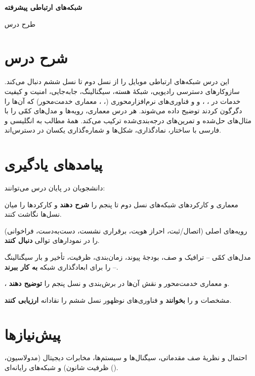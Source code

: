 \documentclass[11pt,a4paper]{article}
\begin{document}
\begin{center}
  {\ACNheadfont\bfseries\color{acnnavy}\LARGE شبکه‌های ارتباطی پیشرفته\par}
  \vspace{2pt}
  {\ACNheadfont\color{acnteal}\Large طرح درس\par}
  \vspace{2pt}
  {\par}
\end{center}

\section{شرح درس}
این درس شبکه‌های ارتباطی موبایل را از نسل دوم تا نسل ششم دنبال می‌کند. سازوکارهای دسترسی رادیویی، شبکهٔ هسته، سیگنالینگ، جابه‌جایی، امنیت و کیفیت
خدمات در ، ،  و  و فناوری‌های نرم‌افزارمحوری (، ، معماری خدمت‌محور) که آن‌ها را دگرگون
کردند توضیح داده می‌شوند. هر درس معماری، رویه‌ها و مدل‌های کمّی را با مثال‌های حل‌شده و تمرین‌های درجه‌بندی‌شده ترکیب می‌کند. همهٔ مطالب به انگلیسی و
فارسی با ساختار، نمادگذاری، شکل‌ها و شماره‌گذاری یکسان در دسترس‌اند.

\section{پیامدهای یادگیری}
دانشجویان در پایان درس می‌توانند:
\begin{objectives}
  \item معماری و کارکردهای شبکه‌های نسل دوم تا پنجم را \textbf{شرح دهند} و کارکردها را میان نسل‌ها نگاشت کنند.
  \item رویه‌های اصلی (اتصال/ثبت، احراز هویت، برقراری نشست، دست‌به‌دست، فراخوانی) را در نمودارهای توالی \textbf{دنبال کنند}.
  \item مدل‌های کمّی -- ترافیک و صف، بودجهٔ پیوند، زمان‌بندی، ظرفیت، تأخیر و بار سیگنالینگ -- را برای ابعادگذاری شبکه \textbf{به کار ببرند}.
  \item {}،  و معماری خدمت‌محور و نقش آن‌ها در برش‌بندی و  نسل پنجم را \textbf{توضیح دهند}.
  \item مشخصات  و  را \textbf{بخوانند} و فناوری‌های نوظهور نسل ششم را نقادانه \textbf{ارزیابی کنند}.
\end{objectives}

\section{پیش‌نیازها}
احتمال و نظریهٔ صف مقدماتی، سیگنال‌ها و سیستم‌ها، مخابرات دیجیتال (مدولاسیون، ظرفیت شانون) و شبکه‌های رایانه‌ای ().
\end{document}
